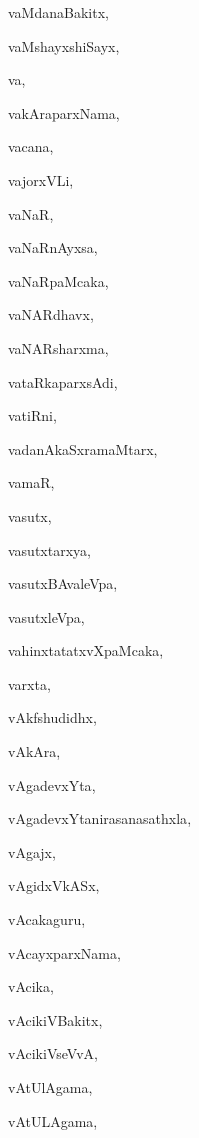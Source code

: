 \begin{multicols}{2}
{vaMdanaBakitx}, \pageref{vaMdanaBakitx}

{vaMshayxshiSayx}, \pageref{vaMshayxshiSayx}

{va}, \pageref{va}

{vakAraparxNama}, \pageref{vakAraparxNama}

{vacana}, \pageref{vacana}

{vajorxVLi}, \pageref{vajorxVLi}

{vaNaR}, \pageref{vaNaR}

{vaNaRnAyxsa}, \pageref{vaNaRnAyxsa}

{vaNaRpaMcaka}, \pageref{vaNaRpaMcaka}

{vaNARdhavx}, \pageref{vaNARdhavx}

{vaNARsharxma}, \pageref{vaNARsharxma}

{vataRkaparxsAdi}, \pageref{vataRkaparxsAdi}

{vatiRni}, \pageref{vatiRni}

{vadanAkaSxramaMtarx}, \pageref{vadanAkaSxramaMtarx}

{vamaR}, \pageref{vamaR}

{vasutx}, \pageref{vasutx}

{vasutxtarxya}, \pageref{vasutxtarxya}

{vasutxBAvaleVpa}, \pageref{vasutxBAvaleVpa}

{vasutxleVpa}, \pageref{vasutxleVpa}

{vahinxtatatxvXpaMcaka}, \pageref{vahinxtatatxvXpaMcaka}

{varxta}, \pageref{varxta}

{vAkfshudidhx}, \pageref{vAkfshudidhx}

{vAkAra}, \pageref{vAkAra}

{vAgadevxYta}, \pageref{vAgadevxYta}

{vAgadevxYtanirasanasathxla}, \pageref{vAgadevxYtanirasanasathxla}

{vAgajx}, \pageref{vAgajx}

{vAgidxVkASx}, \pageref{vAgidxVkASx}

{vAcakaguru}, \pageref{vAcakaguru}

{vAcayxparxNama}, \pageref{vAcayxparxNama}

{vAcika}, \pageref{vAcika}

{vAcikiVBakitx}, \pageref{vAcikiVBakitx}

{vAcikiVseVvA}, \pageref{vAcikiVseVvA}

{vAtUlAgama}, \pageref{vAtUlAgama}

{vAtULAgama}, \pageref{vAtULAgama}


\end{multicols}
